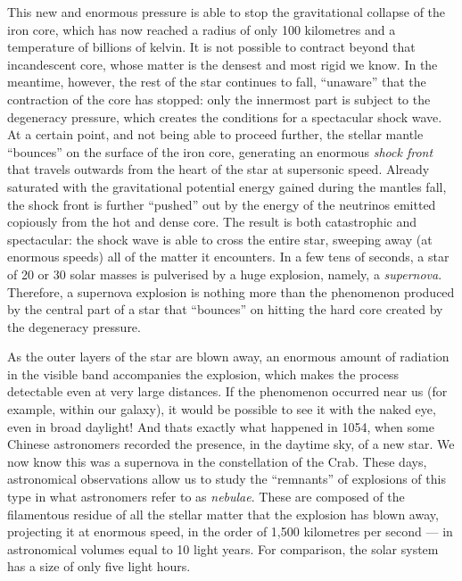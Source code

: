 This new and enormous pressure is able to stop the gravitational
collapse of the iron core, which has now reached a radius of only 100
kilometres and a temperature of billions of kelvin. It is not possible to contract
beyond that incandescent core, whose matter is the densest and most rigid we know. In
the meantime, however, the rest of the star continues to fall, ``unaware'' that the
contraction of the core has stopped: only the innermost part is subject to the
degeneracy pressure, which creates the conditions for a spectacular
shock wave. At a certain point, and not being able to proceed
further, the stellar mantle ``bounces'' on the surface of the iron core, generating an
enormous \emph{shock front} that travels outwards from the heart of the star at
supersonic speed. Already saturated with the gravitational potential energy gained
during the mantle\textquotesingle s fall, the shock front is further ``pushed'' out by
the energy of the neutrinos emitted copiously from the hot and dense
core. The result is both catastrophic and spectacular: the shock wave is able to cross
the entire star, sweeping away (at enormous speeds) all of the matter it encounters. In
a few tens of seconds, a star of 20 or 30 solar masses is pulverised by a huge
explosion, namely, a \emph{supernova}. Therefore, a supernova explosion is nothing more
than the phenomenon produced by the central part of a star that ``bounces'' on hitting
the hard core created by the degeneracy
pressure.

As the outer layers of the star are blown away, an enormous amount of radiation in the
visible band accompanies the explosion, which makes the process detectable even at very
large distances. If the phenomenon occurred near us (for example, within our galaxy), it
would be possible to see it with the naked eye, even in broad daylight! And
that\textquotesingle s exactly what happened in 1054, when some Chinese astronomers
recorded the presence, in the daytime sky, of a new star. We now know this was a
supernova in the constellation of the Crab. These
days, astronomical observations allow us to study the ``remnants'' of explosions of this
type in what astronomers refer to as \emph{nebula}\emph{e}. These are
composed of the filamentous residue of all the stellar matter that the explosion has
blown away, projecting it at enormous speed, in the order of 1,500 kilometres per second
--- in astronomical volumes equal to 10 light years. For comparison, the solar system
has a size of only five light hours.

